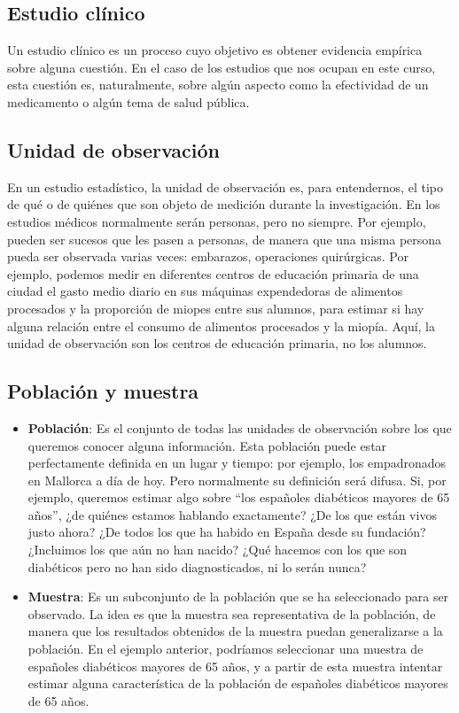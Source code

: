\documentclass[
  spanish,
  letterpaper,
  DIV=11,
  numbers=noendperiod]{scrreprt}
\begin{document}
\subsection{Estudio clínico}\label{estudio-cluxednico}

Un estudio clínico es un proceso cuyo objetivo es obtener evidencia
empírica sobre alguna cuestión. En el caso de los estudios que nos
ocupan en este curso, esta cuestión es, naturalmente, sobre algún
aspecto como la efectividad de un medicamento o algún tema de salud
pública.

\subsection{Unidad de observación}\label{unidad-de-observaciuxf3n}

En un estudio estadístico, la unidad de observación es, para
entendernos, el tipo de qué o de quiénes que son objeto de medición
durante la investigación. En los estudios médicos normalmente serán
personas, pero no siempre. Por ejemplo, pueden ser sucesos que les pasen
a personas, de manera que una misma persona pueda ser observada varias
veces: embarazos, operaciones quirúrgicas. Por ejemplo, podemos medir en
diferentes centros de educación primaria de una ciudad el gasto medio
diario en sus máquinas expendedoras de alimentos procesados y la
proporción de miopes entre sus alumnos, para estimar si hay alguna
relación entre el consumo de alimentos procesados y la miopía. Aquí, la
unidad de observación son los centros de educación primaria, no los
alumnos.

\subsection{Población y muestra}\label{poblaciuxf3n-y-muestra}

\begin{itemize}
\item
  \textbf{Población}: Es el conjunto de todas las unidades de
  observación sobre los que queremos conocer alguna información. Esta
  población puede estar perfectamente definida en un lugar y tiempo: por
  ejemplo, los empadronados en Mallorca a día de hoy. Pero normalmente
  su definición será difusa. Si, por ejemplo, queremos estimar algo
  sobre ``los españoles diabéticos mayores de 65 años'', ¿de quiénes
  estamos hablando exactamente? ¿De los que están vivos justo ahora? ¿De
  todos los que ha habido en España desde su fundación? ¿Incluimos los
  que aún no han nacido? ¿Qué hacemos con los que son diabéticos pero no
  han sido diagnosticados, ni lo serán nunca?
\item
  \textbf{Muestra}: Es un subconjunto de la población que se ha
  seleccionado para ser observado. La idea es que la muestra sea
  representativa de la población, de manera que los resultados obtenidos
  de la muestra puedan generalizarse a la población. En el ejemplo
  anterior, podríamos seleccionar una muestra de españoles diabéticos
  mayores de 65 años, y a partir de esta muestra intentar estimar alguna
  característica de la población de españoles diabéticos mayores de 65
  años.
\end{itemize}
\end{document}
